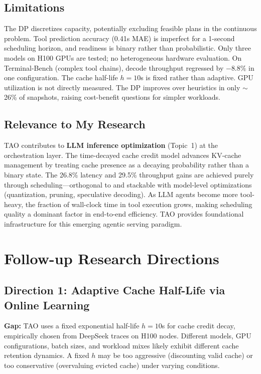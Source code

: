 \documentclass[11pt,a4paper]{article}
\begin{document}
\subsection{Limitations}
The DP discretizes capacity, potentially excluding feasible plans in the continuous problem. Tool prediction accuracy (0.41s MAE) is imperfect for a 1-second scheduling horizon, and readiness is binary rather than probabilistic. Only three models on H100 GPUs are tested; no heterogeneous hardware evaluation. On Terminal-Bench (complex tool chains), decode throughput regressed by $-8.8\%$ in one configuration. The cache half-life $h=10$s is fixed rather than adaptive. GPU utilization is not directly measured. The DP improves over heuristics in only ${\sim}$26\% of snapshots, raising cost-benefit questions for simpler workloads.

\subsection{Relevance to My Research}
TAO contributes to \textbf{LLM inference optimization} (Topic~1) at the orchestration layer. The time-decayed cache credit model advances KV-cache management by treating cache presence as a decaying probability rather than a binary state. The 26.8\% latency and 29.5\% throughput gains are achieved purely through scheduling---orthogonal to and stackable with model-level optimizations (quantization, pruning, speculative decoding). As LLM agents become more tool-heavy, the fraction of wall-clock time in tool execution grows, making scheduling quality a dominant factor in end-to-end efficiency. TAO provides foundational infrastructure for this emerging agentic serving paradigm.

\section{Follow-up Research Directions}

\subsection{Direction 1: Adaptive Cache Half-Life via Online Learning}
\textbf{Gap:} TAO uses a fixed exponential half-life $h = 10$s for cache credit decay, empirically chosen from DeepSeek traces on H100 nodes. Different models, GPU configurations, batch sizes, and workload mixes likely exhibit different cache retention dynamics. A fixed $h$ may be too aggressive (discounting valid cache) or too conservative (overvaluing evicted cache) under varying conditions.
\end{document}
